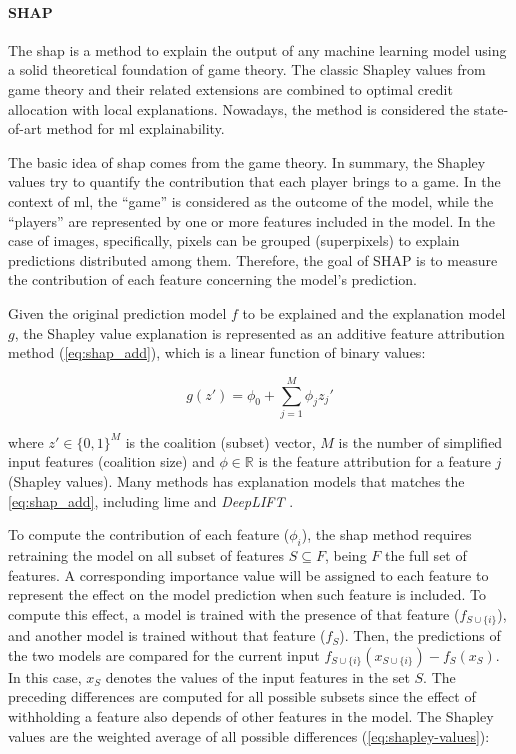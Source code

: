 \paragraph{SHAP}

The \acf{shap} is a method to explain the output of any machine learning model using a solid theoretical foundation of game theory. The classic Shapley values \citep{shapley1953value} from game theory and their related extensions are combined to optimal credit allocation with local explanations. Nowadays, the method is considered the state-of-art method for \acs{ml} explainability.

The basic idea of \acs{shap} comes from the game theory. In summary, the Shapley values try to quantify the contribution that each player brings to a game. In the context of \acl{ml}, the ``game'' is considered as the outcome of the model, while the ``players'' are represented by one or more features included in the model. In the case of images, specifically, pixels can be grouped (superpixels) to explain predictions distributed among them. Therefore, the goal of SHAP is to measure the contribution of each feature concerning the model's prediction.

Given the original prediction model $f$ to be explained and the explanation model $g$, the Shapley value explanation is represented as an additive feature attribution method (\autoref{eq:shap_add}), which is a linear function of binary values:

\begin{equation}
\label{eq:shap_add}
g(z')=\phi_0+\sum_{j=1}^M\phi_jz_j'
\end{equation}

\noindent
where $z' \in \{0,1\}^M$ is the coalition (subset) vector, $M$ is the number of simplified input features (coalition size) and $\phi \in \mathbb{R}$ is the feature attribution for a feature $j$ (Shapley values). Many methods has explanation models that matches the \autoref{eq:shap_add}, including \acs{lime} \citep{lime} and \textit{DeepLIFT} \citep{deeplift_old, deeplift_new}.

To compute the contribution of each feature ($\phi_i$), the \acs{shap} method requires retraining the model on all subset of features $S \subseteq F$, being $F$ the full set of features. A corresponding importance value will be assigned to each feature to represent the effect on the model prediction when such feature is included. To compute this effect, a model is trained with the presence of that feature ($f_{S \cup \{i\}}$), and another model is trained without that feature ($f_S$). Then, the predictions of the two models are compared for the current input $f_{S \cup \{i\}}(x_{S \cup \{i\}}) - f_S(x_S)$. In this case, $x_S$ denotes the values of the input features in the set $S$. The preceding differences are computed for all possible subsets since the effect of withholding a feature also depends of other features in the model. The Shapley values are the weighted average of all possible differences (\autoref{eq:shapley-values}):

